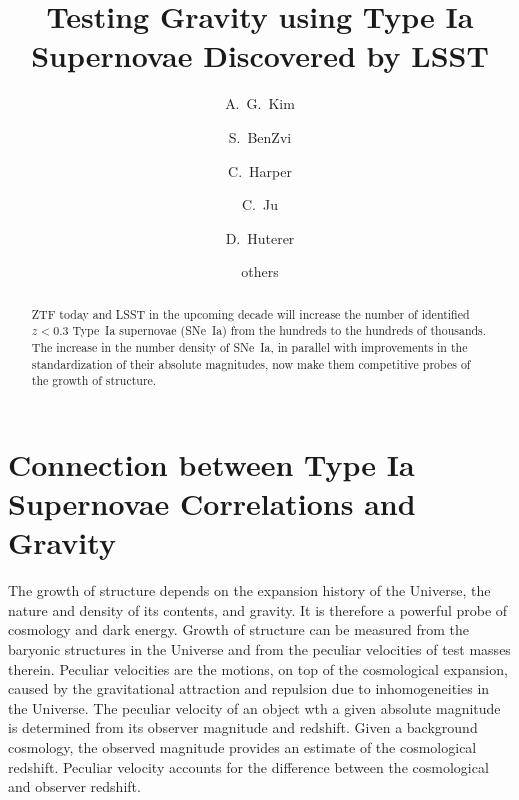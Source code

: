 \documentclass{aastex62}   	%
\begin{document}
\title{Testing Gravity using Type Ia Supernovae Discovered by LSST}
\author[0000-0001-6315-8743]{A.~G.~Kim}
\author{S.~BenZvi}
\author{C.~Harper}
\author{C.~Ju}
\author{D.~Huterer}

\author{others}


\begin{abstract}
ZTF today and LSST in the upcoming decade will increase the number of identified  $z<0.3$ Type~Ia supernovae (SNe~Ia)  from the hundreds to the
hundreds of thousands.  The increase in the number density of SNe~Ia, in parallel with improvements in the standardization of
their absolute magnitudes, now make them competitive probes of the growth of structure.
\end{abstract}

\section{Connection between Type Ia Supernovae Correlations and Gravity}

The growth of structure depends on the expansion history of the Universe, the nature and density of its contents, and gravity. 
It is therefore a powerful probe of cosmology and dark energy.  Growth of structure can be measured from the baryonic structures
in the Universe and from the peculiar velocities of test masses therein.
Peculiar velocities are the motions, on top of the cosmological expansion, caused by the gravitational attraction
and repulsion due to inhomogeneities in the Universe.  The peculiar velocity of an object wth a given absolute magnitude
is determined from its observer magnitude and redshift.  Given a background cosmology, the observed magnitude provides
an estimate of the cosmological redshift.  Peculiar velocity accounts for the difference between the cosmological and observer redshift.
\end{document}
